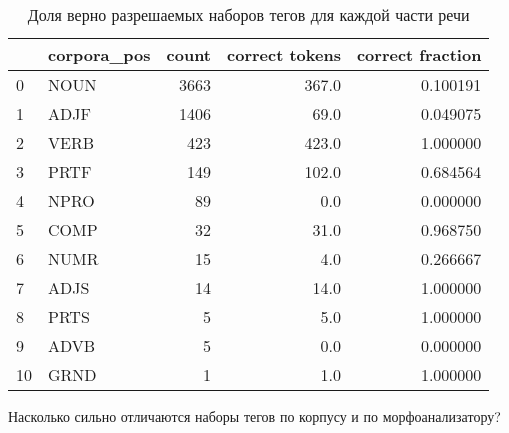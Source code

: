 \documentclass[a4paper,14pt]{article}
\begin{document}
	\begin{table}[h!]
		\begin{center}
		\begin{tabular}{llrrr}
			\toprule
			{} & corpora\_pos &  count &  correct tokens &  correct fraction \\
			\midrule
			0  &        NOUN &   3663 &          367.0 &          0.100191 \\
			1  &        ADJF &   1406 &           69.0 &          0.049075 \\
			2  &        VERB &    423 &          423.0 &          1.000000 \\
			3  &        PRTF &    149 &          102.0 &          0.684564 \\
			4  &        NPRO &     89 &            0.0 &          0.000000 \\
			5  &        COMP &     32 &           31.0 &          0.968750 \\
			6  &        NUMR &     15 &            4.0 &          0.266667 \\
			7  &        ADJS &     14 &           14.0 &          1.000000 \\
			8  &        PRTS &      5 &            5.0 &          1.000000 \\
			9  &        ADVB &      5 &            0.0 &          0.000000 \\
			10 &        GRND &      1 &            1.0 &          1.000000 \\
			\bottomrule
			\end{tabular}

			\caption{Доля верно разрешаемых наборов тегов для каждой части речи}
		\end{center}
	\end{table}

	Насколько сильно отличаются наборы тегов по корпусу и по морфоанализатору?
\end{document}
